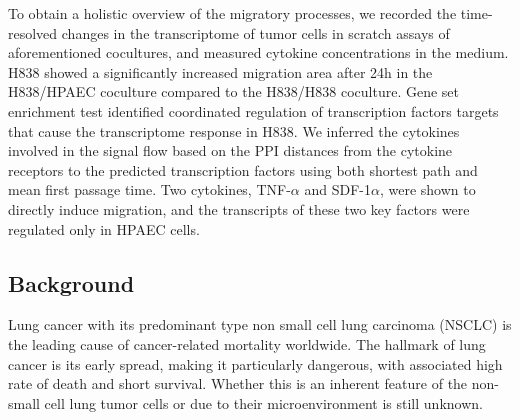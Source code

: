 To obtain a holistic overview of the migratory processes, 
we recorded the time-resolved changes in the transcriptome of tumor cells
in scratch assays of aforementioned cocultures, and measured
cytokine concentrations in the medium.
H838 showed a significantly increased migration area after 24h in the 
H838/HPAEC coculture compared to the H838/H838 coculture.
Gene set enrichment test identified coordinated regulation
of transcription factors targets
that cause the transcriptome response in H838. 
We inferred the cytokines involved in the signal flow based on the 
PPI distances from the cytokine receptors to the predicted
transcription factors using both shortest path and mean first passage time.
Two cytokines, TNF-$\alpha$ and SDF-1$\alpha$, were shown to directly 
induce migration, 
and the transcripts of these two key factors were regulated only 
in HPAEC cells.

\subsection{Background}
Lung cancer with its predominant type non small cell lung carcinoma 
(NSCLC) is the leading cause of cancer-related mortality worldwide.
The hallmark of lung cancer is its early spread, 
making it particularly dangerous, with associated high rate of death 
and short survival.
Whether this is an inherent feature of the non-small cell 
lung tumor cells or 
due to their microenvironment is still unknown. 

